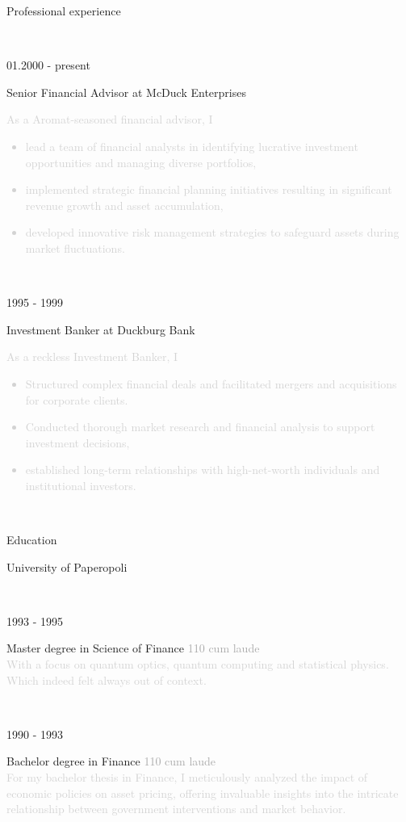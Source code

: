 \documentclass[10pt]{article}
\newcommand{\event}[3]{%
	\begin{minipage}[t]{.25\textwidth}
		{\large #1}
	\end{minipage}%
	\begin{minipage}[t]{.75\textwidth}
		{\large #2}\vspace{5pt} \\ 
		{\normalsize \textcolor{lightgray}{#3}}
	\end{minipage}\vspace{15pt}\\
}
\begin{document}
\begin{minipage}{.5\textwidth}
	{\LARGE Professional experience}
\end{minipage}\\

\event{  %
01.2000 - present
}{Senior Financial Advisor at McDuck Enterprises}{
As a Aromat-seasoned financial advisor, I 
\begin{itemize}
\item lead a team of financial analysts in identifying lucrative investment opportunities and managing diverse portfolios,
\item implemented strategic financial planning initiatives resulting in significant revenue growth and asset accumulation,
\item developed innovative risk management strategies to safeguard assets during market fluctuations.
\end{itemize}
}

\event{1995 - 1999}{Investment Banker at Duckburg Bank}{ %
As a reckless Investment Banker, I
\begin{itemize}
\item Structured complex financial deals and facilitated mergers and acquisitions for corporate clients.
\item Conducted thorough market research and financial analysis to support investment decisions,
\item established long-term relationships with high-net-worth individuals and institutional investors.
\end{itemize}}

\hfill 


\begin{minipage}[b]{.25\textwidth}
{\LARGE Education}
\end{minipage}
\begin{minipage}[b]{.75\textwidth}
{\large University of Paperopoli}
\end{minipage}
\\

\event{1993 - 1995}{Master degree in Science of Finance \hfill \textcolor{darkgray}{110 cum laude}}{With a focus on quantum optics, quantum computing and statistical physics. Which indeed felt always out of context.}
\event{1990 - 1993}{Bachelor degree in Finance \hfill \textcolor{darkgray}{110 cum laude}}{
For my bachelor thesis in Finance, I meticulously analyzed the impact of economic policies on asset pricing, offering invaluable insights into the intricate relationship between government interventions and market behavior.
}
\end{document}
